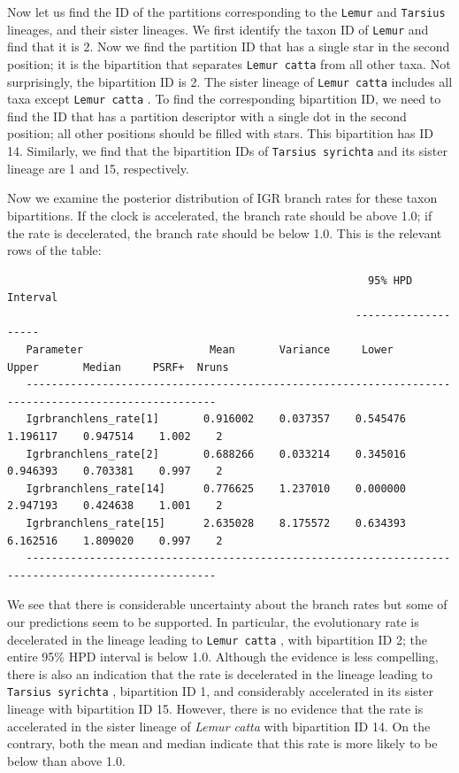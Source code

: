 \documentclass[12pt]{book}
\newcommand{\ttt}[1]{\texttt{#1} }
\begin{document}
Now let us find the ID of the partitions corresponding to the \ttt{Lemur} and \ttt{Tarsius}
lineages, and their sister lineages. We first identify the taxon ID of \ttt{Lemur} and find that
it is 2. Now we find the partition ID that has a single star in the second position; it is the
bipartition that separates \ttt{Lemur catta} from all other taxa. Not surprisingly, the
bipartition ID is 2. The sister lineage of \ttt{Lemur catta} includes all taxa except
\ttt{Lemur catta}. To find the corresponding bipartition ID, we need to find the ID that has a
partition descriptor with a single dot in the second position; all other positions should be filled
with stars. This bipartition has ID 14. Similarly, we find that the bipartition IDs of
\ttt{Tarsius syrichta} and its sister lineage are 1 and 15, respectively.

Now we examine the posterior distribution of IGR branch rates for these taxon bipartitions. If the
clock is accelerated, the branch rate should be above 1.0; if the rate is decelerated, the branch
rate should be below 1.0. This is the relevant rows of the table:

\scriptsize
\begin{singlespacing}
\begin{verbatim}
                                                         95% HPD Interval
                                                       --------------------
   Parameter                    Mean       Variance     Lower       Upper       Median     PSRF+  Nruns
   ----------------------------------------------------------------------------------------------------
   Igrbranchlens_rate[1]       0.916002    0.037357    0.545476    1.196117    0.947514    1.002    2
   Igrbranchlens_rate[2]       0.688266    0.033214    0.345016    0.946393    0.703381    0.997    2
   Igrbranchlens_rate[14]      0.776625    1.237010    0.000000    2.947193    0.424638    1.001    2
   Igrbranchlens_rate[15]      2.635028    8.175572    0.634393    6.162516    1.809020    0.997    2
   ----------------------------------------------------------------------------------------------------
\end{verbatim}
\end{singlespacing}
\normalsize

We see that there is considerable uncertainty about the branch rates but some of our predictions
seem to be supported. In particular, the evolutionary rate is decelerated in the lineage leading to
\ttt{Lemur catta}, with bipartition ID 2; the entire 95\% HPD interval is below 1.0. Although
the evidence is less compelling, there is also an indication that the rate is decelerated in the
lineage leading to \ttt{Tarsius syrichta}, bipartition ID 1, and considerably accelerated in its
sister lineage with bipartition ID 15. However, there is no evidence that the rate is accelerated
in the sister lineage of \textit{Lemur catta} with bipartition ID 14. On the contrary, both the
mean and median indicate that this rate is more likely to be below than above 1.0.
\end{document}
